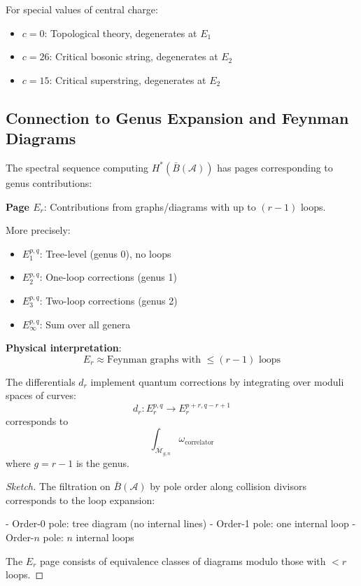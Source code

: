 \begin{theorem}[Degeneration at $E_2$]
For special values of central charge:
\begin{itemize}
\item $c = 0$: Topological theory, degenerates at $E_1$
\item $c = 26$: Critical bosonic string, degenerates at $E_2$  
\item $c = 15$: Critical superstring, degenerates at $E_2$
\end{itemize}
\end{theorem}

\subsection{Connection to Genus Expansion and Feynman Diagrams}

\begin{theorem}[Spectral Sequence = Genus Expansion]\label{thm:ss-genus}
The spectral sequence computing $H^*(\bar{B}(\mathcal{A}))$ has pages corresponding to genus contributions:

\textbf{Page $E_r$}: Contributions from graphs/diagrams with up to $(r-1)$ loops.

More precisely:
\begin{itemize}
\item $E_1^{p,q}$: Tree-level (genus 0), no loops
\item $E_2^{p,q}$: One-loop corrections (genus 1)  
\item $E_3^{p,q}$: Two-loop corrections (genus 2)
\item $E_\infty^{p,q}$: Sum over all genera
\end{itemize}

\textbf{Physical interpretation}:
$$E_r \approx \text{Feynman graphs with } \leq (r-1) \text{ loops}$$

The differentials $d_r$ implement quantum corrections by integrating over moduli spaces of curves:
$$d_r: E_r^{p,q} \to E_r^{p+r,q-r+1}$$
corresponds to
$$\int_{\overline{\mathcal{M}}_{g,n}} \omega_{\text{correlator}}$$
where $g = r-1$ is the genus.
\end{theorem}

\begin{proof}[Sketch]
The filtration on $\bar{B}(\mathcal{A})$ by pole order along collision divisors corresponds to the loop expansion:

- Order-0 pole: tree diagram (no internal lines)
- Order-1 pole: one internal loop  
- Order-$n$ pole: $n$ internal loops

The $E_r$ page consists of equivalence classes of diagrams modulo those with $<r$ loops.
\end{proof}

